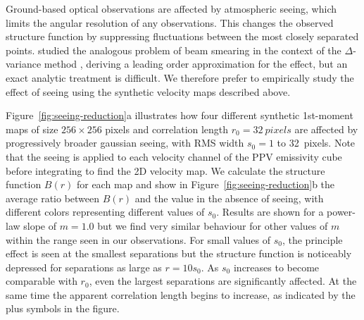 \documentclass[fleqn,usenatbib, useAMS, a4paper]{mnras}
\newcommand\startNEW{\color{NEWcolor}}
\newcommand\stopNEW{\color{black}}
\newcommand\NEW[1]{\startNEW #1\stopNEW\relax}
\begin{document}
Ground-based optical observations are affected by atmospheric seeing,
which limits the angular resolution of any observations.
This changes the observed structure function by suppressing fluctuations
between the most closely separated points.
\citet{Bensch:2001l} studied the  analogous problem
of beam smearing in the context of the \(\Delta\)-variance method \citep{Stutzki:1998a}, 
deriving a leading order approximation for the effect,
but an exact analytic treatment is difficult.
We therefore prefer to empirically study the effect of seeing using the
synthetic velocity maps described above.

\NEW{Figure~\ref{fig:seeing-reduction}a} illustrates how four different
synthetic \NEW{1st-moment maps of} size \(256\times256\) pixels
and correlation length \NEW{\(r_0 = \SI{32}{pixels}\)}
are affected by progressively broader gaussian seeing,
with RMS width \(s_0 = 1\) to \SI{32}{pixels}.
\NEW{%
  Note that the seeing is applied to each velocity channel of the
  PPV emissivity cube before integrating to find the 2D velocity map.
}
We calculate the structure function \(B(r)\) for each map and show
in Figure~\ref{fig:seeing-reduction}b the average ratio between
\(B(r)\) and the value in the absence of seeing,
with different colors representing different values of \(s_0\).
Results are shown for a power-law slope of \NEW{\(m = 1.0\)}
but we find very similar behaviour for other values of \(m\) within the range
seen in our observations.
For small values of \(s_0\), the principle effect is seen at
the smallest separations but the structure function is noticeably depressed
for separations as large as \(r = 10 s_0\).
As \(s_0\) increases to become comparable with \(r_0\),
even the largest separations are significantly affected.
At the same time the apparent correlation length begins to increase,
as indicated by the plus symbols in the figure.
\end{document}
